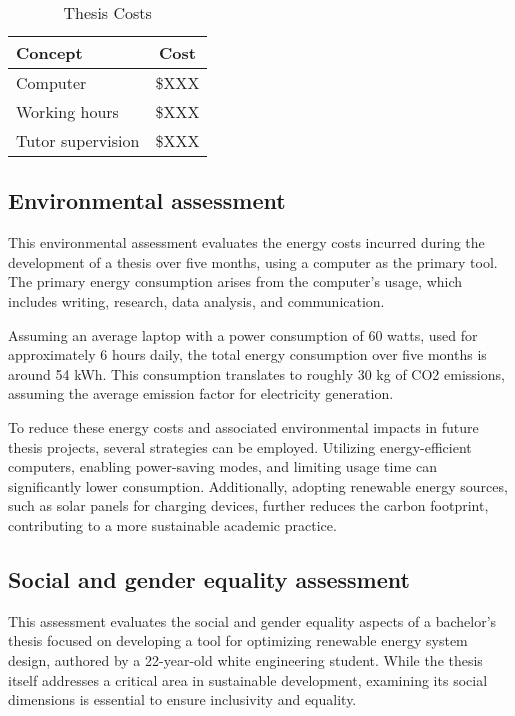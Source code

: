 \documentclass[a4paper,11pt, titlepage, twoside]{article}
\begin{document}
\begin{table}[h]
\centering
\begin{tabular}{l|c}
\hline
\textbf{Concept} & \textbf{Cost} \\
\hline
Computer & \$XXX \\
Working hours & \$XXX \\
Tutor supervision & \$XXX \\
\hline
\end{tabular}
\caption{Thesis Costs}
\label{tab:costs}
\end{table}

\subsection{Environmental assessment}

This environmental assessment evaluates the energy costs incurred during
the development of a thesis over five months, using a computer as the primary tool. The primary energy consumption arises
from the computer's usage, which includes writing, research, data analysis, and communication.\par

Assuming an average laptop with a power consumption of 60 watts, used for approximately 6 hours daily, the total energy consumption
over five months is around 54 kWh. This consumption translates to roughly 30 kg of CO2 emissions, assuming the average emission
factor for electricity generation.\par

To reduce these energy costs and associated environmental impacts in future thesis projects, several strategies can be employed.
Utilizing energy-efficient computers, enabling power-saving modes, and limiting usage time can significantly lower consumption.
Additionally, adopting renewable energy sources, such as solar panels for charging devices, further reduces the carbon footprint,
contributing to a more sustainable academic practice.

\subsection{Social and gender equality assessment}

This assessment evaluates the social and gender equality aspects of a bachelor's thesis focused on developing a tool for optimizing renewable energy system design, authored by a 22-year-old white engineering student. While the thesis itself addresses a critical area in sustainable development, examining its social dimensions is essential to ensure inclusivity and equality.
\end{document}
